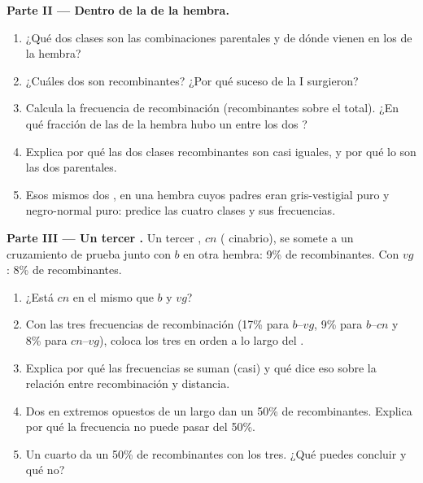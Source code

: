 \begin{problem}
\medskip
\noindent\textbf{Parte II --- Dentro de la  de la hembra.}
\begin{enumerate}[resume]
  \item ¿Qué dos clases son las combinaciones parentales y de dónde
        vienen en los  de la hembra?
  \item ¿Cuáles dos son recombinantes? ¿Por qué suceso de la  I
        surgieron?
  \item Calcula la frecuencia de recombinación (recombinantes sobre el
        total). ¿En qué fracción de las  de la hembra hubo un
         entre los dos ?
  \item Explica por qué las dos clases recombinantes son casi iguales,
        y por qué lo son las dos parentales.
  \item Esos mismos dos , en una hembra cuyos padres eran
        gris-vestigial puro y negro-normal puro: predice las cuatro
        clases y sus frecuencias.
\end{enumerate}

\medskip
\noindent\textbf{Parte III --- Un tercer .}
Un tercer , $cn$ ( cinabrio), se somete a un cruzamiento de
prueba junto con $b$ en otra hembra: 9\% de recombinantes. Con $vg$:
8\% de recombinantes.
\begin{enumerate}[resume]
  \item ¿Está $cn$ en el mismo  que $b$ y $vg$?
  \item Con las tres frecuencias de recombinación (17\% para $b$--$vg$,
        9\% para $b$--$cn$ y 8\% para $cn$--$vg$), coloca los tres
         en orden a lo largo del .
  \item Explica por qué las frecuencias se suman (casi) y qué dice eso
        sobre la relación entre recombinación y distancia.
  \item Dos  en extremos opuestos de un  largo dan un
        50\% de recombinantes. Explica por qué la frecuencia no puede
        pasar del 50\%.
  \item Un cuarto  da un 50\% de recombinantes con los tres. ¿Qué
        puedes concluir y qué no?
\end{enumerate}


\end{problem}
